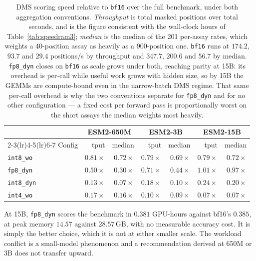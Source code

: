 \documentclass[11pt]{article}
\newcommand{\cfg}[1]{\texttt{#1}}
\begin{document}
\begin{table}[htb]
\centering
\caption{DMS scoring speed relative to \cfg{bf16} over the full benchmark,
under both aggregation conventions. \emph{Throughput} is total masked positions
over total seconds, and is the figure consistent with the wall-clock hours of
Table~\ref{tab:speedram3}; \emph{median} is the median of the 201 per-assay
rates, which weights a 40-position assay as heavily as a 900-position one.
\cfg{bf16} runs at $174.2$, $93.7$ and $29.4$ positions/s by throughput and
$347.7$, $200.6$ and $56.7$ by median. \cfg{fp8\_dyn} closes on \cfg{bf16} as
scale grows under both, reaching parity at 15B: its overhead is per-call while
useful work grows with hidden size, so by 15B the GEMMs are compute-bound even
in the narrow-batch DMS regime. That same per-call overhead is why the two
conventions separate for \cfg{fp8\_dyn} and for no other configuration --- a
fixed cost per forward pass is proportionally worst on the short assays the
median weights most heavily.}
\label{tab:scale}
\small
\begin{tabular}{lrrrrrr}
\toprule
& \multicolumn{2}{c}{ESM2-650M} & \multicolumn{2}{c}{ESM2-3B} & \multicolumn{2}{c}{ESM2-15B} \\
\cmidrule(lr){2-3}\cmidrule(lr){4-5}\cmidrule(lr){6-7}
Config & tput & median & tput & median & tput & median \\
\midrule
\cfg{int8\_wo}  & $0.81\times$ & $0.72\times$ & $0.79\times$ & $0.69\times$ & $0.79\times$ & $0.72\times$ \\
\cfg{fp8\_dyn}  & $0.50\times$ & $0.30\times$ & $0.71\times$ & $0.44\times$ & $\mathbf{1.01\times}$ & $\mathbf{0.97\times}$ \\
\cfg{int8\_dyn} & $0.13\times$ & $0.07\times$ & $0.18\times$ & $0.10\times$ & $0.24\times$ & $0.20\times$ \\
\cfg{int4\_wo}  & $0.17\times$ & $0.16\times$ & $0.10\times$ & $0.09\times$ & $0.07\times$ & $0.07\times$ \\
\bottomrule
\end{tabular}
\end{table}

At 15B, \cfg{fp8\_dyn} scores the benchmark in $0.381$ GPU-hours against bf16's
$0.385$, at peak memory $14.57$ against $28.57$\,GB, with no measurable accuracy
cost. It is simply the better choice, which it is not at either smaller scale.
The workload conflict is a small-model phenomenon and a recommendation derived
at 650M or 3B does not transfer upward.
\end{document}
